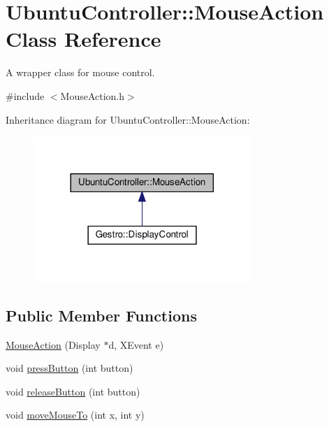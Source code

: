 \hypertarget{classUbuntuController_1_1MouseAction}{}\section{Ubuntu\+Controller\+:\+:Mouse\+Action Class Reference}
\label{classUbuntuController_1_1MouseAction}


A wrapper class for mouse control.  




{\ttfamily \#include $<$Mouse\+Action.\+h$>$}



Inheritance diagram for Ubuntu\+Controller\+:\+:Mouse\+Action\+:
\nopagebreak
\begin{figure}[H]
\begin{center}
\leavevmode
\includegraphics[width=233pt]{classUbuntuController_1_1MouseAction__inherit__graph}
\end{center}
\end{figure}
\subsection*{Public Member Functions}
\begin{DoxyCompactItemize}
\item 
\hyperlink{classUbuntuController_1_1MouseAction_a42e540b994144f3f8775baded5370b14}{Mouse\+Action} (Display $\ast$d, X\+Event e)
\item 
void \hyperlink{classUbuntuController_1_1MouseAction_aa017b86a7e358e7a74a8ec50a5a191cf}{press\+Button} (int button)
\item 
void \hyperlink{classUbuntuController_1_1MouseAction_ab1ac193e88baf8614c55ca2fa7a3b430}{release\+Button} (int button)
\item 
void \hyperlink{classUbuntuController_1_1MouseAction_a7a14cab01ad2ccdb1b135d4bae939fe2}{move\+Mouse\+To} (int x, int y)
\end{DoxyCompactItemize}


